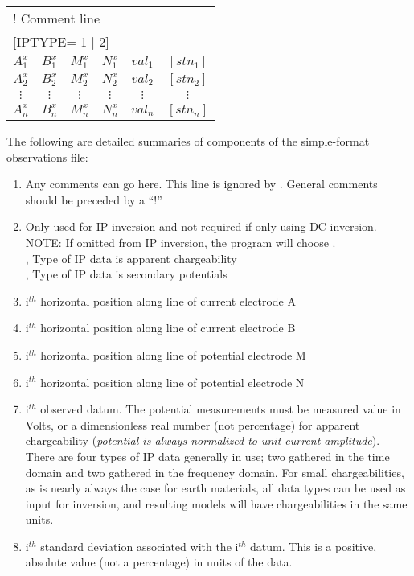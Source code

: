 \begin{fileExample}
\begin{tabular}{|cccccc|}
\hline
\multicolumn{6}{|l|}{! Comment line} \\
\multicolumn{6}{|l|}{[IPTYPE= 1 | 2]} \\
$A_1^x$ & $B_1^x$ &  $M_1^x$ & $N_1^x$ & $ val_1$ & $[stn_1]$ \\
$A_2^x$ & $B_2^x$ &  $M_2^x$ & $N_2^x$ & $ val_2$ & $[stn_2]$\\
$\vdots$ & $\vdots$ & $\vdots$ & $\vdots$ & $\vdots$ & $\vdots$\\
$A_n^x$ & $B_n^x$ &  $M_n^x$ & $N_n^x$ & $ val_n$ & $[stn_n]$\\
\hline
\end{tabular}
\end{fileExample}

The following are detailed summaries of components of the simple-format observations file:
\begin{enumerate}
\item[\codeName{! Comment Line}] Any comments can go here. This line is ignored by . General comments should be preceded by a ``!''
\item[\codeName{IPTYPE}] Only used for IP inversion and not required if only using DC inversion. NOTE: If omitted from IP inversion, the program will choose . \\
     , Type of IP data is apparent chargeability \\
		 , Type of IP data is secondary potentials
%
\item[\codeName{A$_i^x$}] i$^{th}$ horizontal position along line of current electrode A
\item[\codeName{B$_i^x$}] i$^{th}$ horizontal position along line of current electrode B
\item[\codeName{M$_j^x$}] i$^{th}$ horizontal position along line of potential electrode M
\item[\codeName{N$_j^x$}] i$^{th}$ horizontal position along line of potential electrode N
\item[\codeName{val$_i$}] i$^{th}$ observed datum. The potential measurements must be measured value in Volts, or a dimensionless real number (not percentage) for apparent chargeability (\textit{potential is always normalized to unit current amplitude}). There are four types of IP data generally in use; two gathered in the time domain and two gathered in the frequency domain. For small chargeabilities, as is nearly always the case for earth materials, all data types can be used as input for inversion, and resulting models will have chargeabilities in the same units.
\item[\codeName{stn$_j$}] i$^{th}$ standard deviation associated with the i$^{th}$ datum. This is a positive, absolute value (not a percentage) in units of the data.
\end{enumerate}


